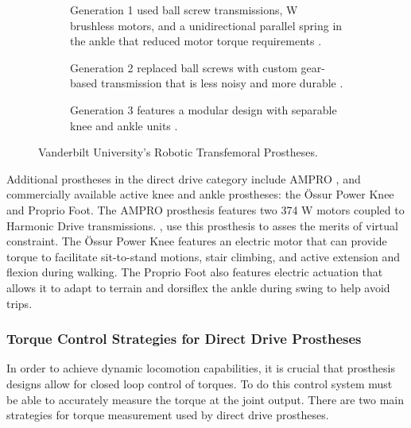 \begin{figure*}[t]
    \centering
	\begin{subfigure}[t]{0.3\textwidth}
    	\centering
        \caption{Generation 1 used ball screw transmissions, \unit[200]{W}
        brushless motors, and a unidirectional parallel spring in the ankle that
        reduced motor torque requirements \citep{sup2009preliminary}.}
        \label{fig:vanderbilt_gen_1}
	\end{subfigure}
	\begin{subfigure}[t]{0.3\textwidth}
    	\centering
        \caption{Generation 2 replaced ball screws with custom gear-based
        transmission that is less noisy and more durable
        \citep{lawson2013control}.}
	\end{subfigure}
	\begin{subfigure}[t]{0.3\textwidth}
    	\centering
        \caption{Generation 3 features a modular design with separable knee and
        ankle units \citep{lawson2014robotic}.}
	\end{subfigure}
    \caption{Vanderbilt University's Robotic Transfemoral Prostheses.}
    \label{fig:vanderbilt_prostheses}
\end{figure*}

Additional prostheses in the direct drive category include AMPRO
\citep{zhao2016first}, and commercially available active knee and ankle
prostheses: the Össur Power Knee and Proprio Foot. The AMPRO prosthesis features
two 374 W motors coupled to Harmonic Drive transmissions.
\citet{zhao2016first}, use this prosthesis to asses the merits of virtual
constraint. The Össur Power Knee features an electric motor that can provide
torque to facilitate sit-to-stand motions, stair climbing, and active extension
and flexion during walking. The Proprio Foot also features electric actuation
that allows it to adapt to terrain and dorsiflex the ankle during swing to help
avoid trips. 

\subsubsection{Torque Control Strategies for Direct Drive
Prostheses}In order to achieve dynamic locomotion capabilities, it is crucial that
prosthesis designs allow for closed loop control of torques. To do this control
system must be able to accurately measure the torque at the joint output. There
are two main strategies for torque measurement used by direct drive prostheses.

